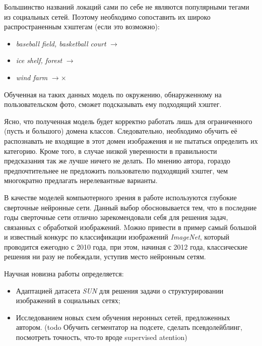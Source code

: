 \indent
  Большинство названий локаций сами по себе не являются популярными 
  тегами из социальных сетей. Поэтому необходимо
  сопоставить их широко распространенным хэштегам (если это возможно):
  
  \begin{itemize}
      \item \textit{baseball field, basketball court}  $\rightarrow$ 
      \item \textit{ice shelf, forest} $\rightarrow$ 
      \item \textit{wind farm} $\rightarrow \times$ 
  \end{itemize}
  
  \indent
  Обученная на таких данных модель по окружению,
   обнаруженному на пользовательском фото,
  сможет подсказывать ему подходящий хэштег.
  
  
  
  \indent
  Ясно, что полученная модель будет корректно работать лишь для
  ограниченного (пусть и большого) домена классов. Следовательно, необходимо 
  обучить её распознавать не входящие в этот домен изображения и
   не пытаться определить их категорию. Кроме того, в случае низкой уверенности
   в правильности предсказания так же лучше ничего не делать. 
    По мнению автора, гораздо предпочтительнее не 
   предложить пользователю подходящий хэштег, чем многократно предлагать 
   нерелевантные варианты.
   
   \indent
В качестве моделей компьютерного зрения в работе 
используются глубокие сверточные
нейронные сети. Данный выбор обосновывается тем, что в последние
годы сверточные сети отлично зарекомендовали себя для решения задач, связанных
с обработкой изображений. Mожно привести в пример самый большой 
и известный
конкурс по классификации изображений \textit{ImageNet}\cite{imagenet},
который проводится ежегодно с 2010 года, при этом, начиная с 2012 года, классические
решения ни разу не побеждали, уступив место нейронным сетям.


  \indent
Научная новизна работы определяется:
\begin{itemize}

    \item Адаптацией датасета \textit{SUN} для решения задачи о структурировании
    изображений в социальных сетях;
    
    \item Исследованием новых схем обучения неронных сетей, предложенных автором.
     (todo Обучить сегментатор на подсете, сделать псевдолейблинг, 
     посмотреть точность, 
    что-то вроде supervised atention)
    
\end{itemize}







